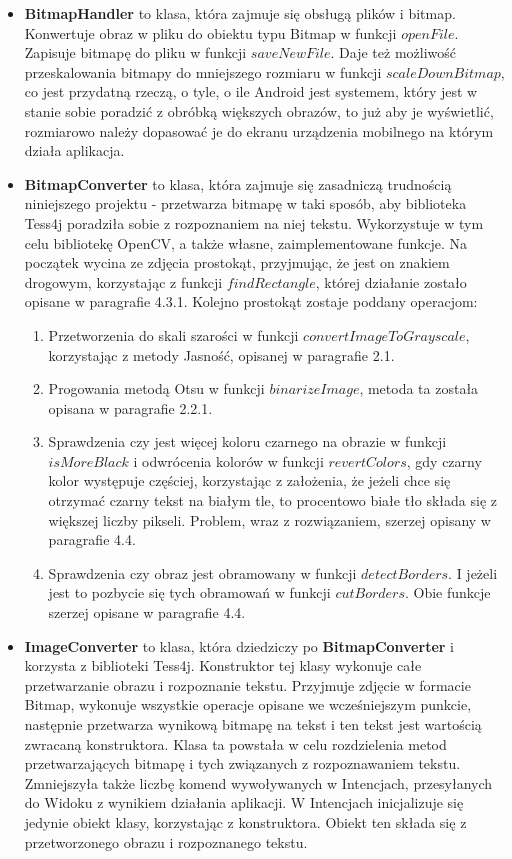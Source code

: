 \documentclass[eng,oneside]{mgr}
\begin{document}
\begin{itemize}
\item \textbf{BitmapHandler} to klasa, która zajmuje się obsługą plików i bitmap. Konwertuje obraz w pliku do obiektu typu Bitmap w funkcji $openFile$. Zapisuje bitmapę do pliku w funkcji $saveNewFile$. Daje też możliwość przeskalowania bitmapy do mniejszego rozmiaru w funkcji $scaleDownBitmap$, co jest przydatną rzeczą, o tyle, o ile Android jest systemem, który jest w stanie sobie poradzić z obróbką większych obrazów, to już aby je wyświetlić, rozmiarowo należy dopasować je do ekranu urządzenia mobilnego na którym działa aplikacja.
\item \textbf{BitmapConverter} to klasa, która zajmuje się zasadniczą trudnością niniejszego projektu - przetwarza bitmapę w taki sposób, aby biblioteka Tess4j poradziła sobie z rozpoznaniem na niej tekstu. Wykorzystuje w tym celu bibliotekę OpenCV, a także własne, zaimplementowane funkcje. Na początek wycina ze zdjęcia prostokąt, przyjmując, że jest on znakiem drogowym, korzystając z funkcji $findRectangle$, której działanie zostało opisane w paragrafie 4.3.1. Kolejno prostokąt zostaje poddany operacjom: 
\begin{enumerate}
\item Przetworzenia do skali szarości w funkcji $convertImageToGrayscale$, korzystając z metody Jasność, opisanej w paragrafie 2.1.
\item Progowania metodą Otsu w funkcji $binarizeImage$, metoda ta została opisana w paragrafie 2.2.1.
\item Sprawdzenia czy jest więcej koloru czarnego na obrazie w funkcji $isMoreBlack$ i odwrócenia kolorów w funkcji $revertColors$, gdy czarny kolor występuje częściej, korzystając z założenia, że jeżeli chce się otrzymać czarny tekst na białym tle, to procentowo białe tło składa się z większej liczby pikseli. Problem, wraz z rozwiązaniem, szerzej opisany w paragrafie 4.4.
\item Sprawdzenia czy obraz jest obramowany w funkcji $detectBorders$. I jeżeli jest to pozbycie się tych obramowań w funkcji $cutBorders$. Obie funkcje szerzej opisane w paragrafie 4.4.
\end{enumerate}
\item \textbf{ImageConverter} to klasa, która dziedziczy po \textbf{BitmapConverter} i korzysta z biblioteki Tess4j. Konstruktor tej klasy wykonuje całe przetwarzanie obrazu i rozpoznanie tekstu. Przyjmuje zdjęcie w formacie Bitmap, wykonuje wszystkie operacje opisane we wcześniejszym punkcie, następnie przetwarza wynikową bitmapę na tekst i ten tekst jest wartością zwracaną konstruktora. Klasa ta powstała w celu rozdzielenia metod przetwarzających bitmapę i tych związanych z rozpoznawaniem tekstu. Zmniejszyła także liczbę komend wywoływanych w Intencjach, przesyłanych do Widoku z wynikiem działania aplikacji. W Intencjach inicjalizuje się jedynie obiekt klasy, korzystając z konstruktora. Obiekt ten składa się z przetworzonego obrazu i rozpoznanego tekstu.
\end{itemize}
\end{document}
